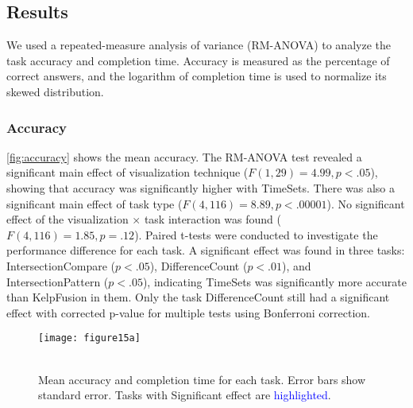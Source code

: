 \subsection{Results}
We used a repeated-measure analysis of variance (RM-ANOVA) to analyze the task accuracy and completion time. Accuracy is measured as the percentage of correct answers, and the logarithm of completion time is used to normalize its skewed distribution.

\subsubsection{Accuracy}
\autoref{fig:accuracy} shows the mean accuracy. The RM-ANOVA test revealed a significant main effect of visualization technique ($F(1,29)=4.99, p<.05$), showing that accuracy was significantly higher with TimeSets. There was also a significant main effect of task type ($F(4,116)=8.89, p<.00001$). No significant effect of the visualization $\times$ task interaction was found ($F(4,116)=1.85, p=.12$). Paired t-tests were conducted to investigate the performance difference for each task. A significant effect was found in three tasks: IntersectionCompare ($p<.05$), DifferenceCount ($p<.01$), and IntersectionPattern ($p<.05$), indicating TimeSets was significantly more accurate than KelpFusion in them. Only the task DifferenceCount still had a significant effect with corrected p-value for multiple tests using Bonferroni correction.

\begin{figure}[!htb]
	\centering
	 {\texttt{[image: figure15a]}} \\
	\\
	\caption{Mean accuracy and completion time for each task. Error bars show standard error. Tasks with Significant effect are \textcolor{blue}{highlighted}.}
\end{figure}


